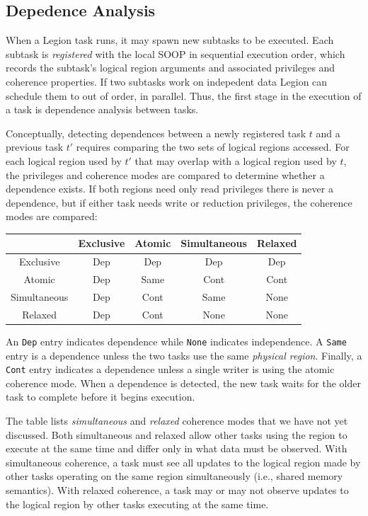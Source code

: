 

\subsection{Depedence Analysis}
\label{sec:dep}


When a Legion task runs, it may spawn new subtasks to be executed.
Each subtask is {\em registered} with the local SOOP in sequential execution
order, which records the subtask's logical region arguments and associated privileges and coherence properties.  If two subtasks work on indepedent data Legion can schedule
them to out of order, in parallel.  Thus, the first stage in the
execution of a task is dependence analysis between tasks.

Conceptually, detecting dependences between a newly registered task $t$ and a previous task 
$t'$ requires comparing the two sets of logical regions accessed.  For each logical region used by
$t'$ that may overlap with a logical region used by $t$, the privileges
and coherence modes are compared to determine whether a dependence exists.  If
both regions need only read privileges there is never a dependence, but if either
task needs write or reduction privileges, the coherence modes are compared:
{\small
\begin{tabular}{c|cccc}
             & Exclusive & Atomic   & Simultaneous & Relaxed \\
\midrule
Exclusive    & Dep & Dep & Dep & Dep \\ 
Atomic       & Dep & Same & Cont & Cont \\
Simultaneous & Dep & Cont & Same & None \\
Relaxed      & Dep & Cont & None & None \\
\end{tabular}
}

An {\tt Dep} entry indicates dependence while {\tt None}
indicates independence.  A {\tt Same} entry is a dependence unless the two tasks
use the same {\em physical region}.  Finally, a {\tt Cont} entry
indicates a dependence unless a single writer is using the
atomic coherence mode.  When a dependence is detected, the new task
waits for the older task to complete before it begins execution.

The table lists {\em simultaneous} and {\em relaxed} coherence modes
that we have not yet discussed.  Both simultaneous and relaxed
allow other tasks using the region to execute at the same time and differ
only in what data must be observed.  With simultaneous coherence, a task must 
see all updates to the logical region made by other tasks operating on the same region 
simultaneously (i.e., shared memory semantics).  With relaxed coherence, 
a task may or may not observe updates to the logical region by other tasks executing at
the same time.

